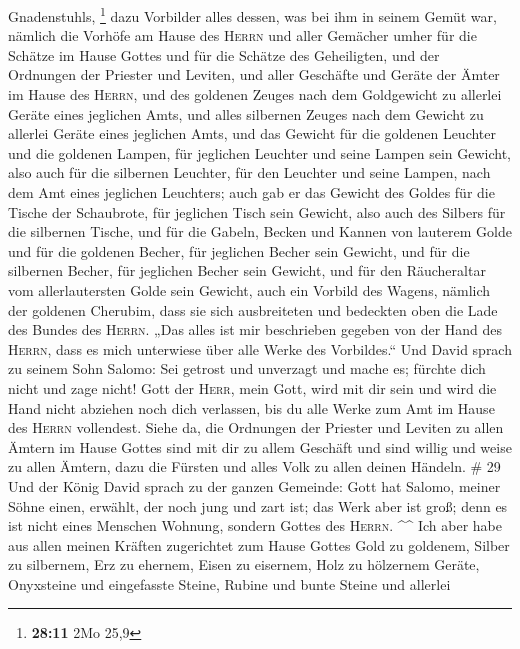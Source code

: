 Gnadenstuhls, \footnote{\textbf{28:11} 2Mo 25,9}  dazu
Vorbilder alles dessen, was bei ihm in seinem Gemüt war, nämlich die
Vorhöfe am Hause des \textsc{Herrn} und aller Gemächer umher für die
Schätze im Hause Gottes und für die Schätze des Geheiligten,
 und der Ordnungen der Priester und Leviten, und aller
Geschäfte und Geräte der Ämter im Hause des \textsc{Herrn},
 und des goldenen Zeuges nach dem Goldgewicht zu allerlei
Geräte eines jeglichen Amts, und alles silbernen Zeuges nach dem Gewicht
zu allerlei Geräte eines jeglichen Amts,  und das Gewicht
für die goldenen Leuchter und die goldenen Lampen, für jeglichen
Leuchter und seine Lampen sein Gewicht, also auch für die silbernen
Leuchter, für den Leuchter und seine Lampen, nach dem Amt eines
jeglichen Leuchters;  auch gab er das Gewicht des Goldes
für die Tische der Schaubrote, für jeglichen Tisch sein Gewicht, also
auch des Silbers für die silbernen Tische,  und für die
Gabeln, Becken und Kannen von lauterem Golde und für die goldenen
Becher, für jeglichen Becher sein Gewicht, und für die silbernen Becher,
für jeglichen Becher sein Gewicht,  und für den
Räucheraltar vom allerlautersten Golde sein Gewicht, auch ein Vorbild
des Wagens, nämlich der goldenen Cherubim, dass sie sich ausbreiteten
und bedeckten oben die Lade des Bundes des \textsc{Herrn}.
 „Das alles ist mir beschrieben gegeben von der Hand des
\textsc{Herrn}, dass es mich unterwiese über alle Werke des Vorbildes.``
 Und David sprach zu seinem Sohn Salomo: Sei getrost und
unverzagt und mache es; fürchte dich nicht und zage nicht! Gott der
\textsc{Herr}, mein Gott, wird mit dir sein und wird die Hand nicht
abziehen noch dich verlassen, bis du alle Werke zum Amt im Hause des
\textsc{Herrn} vollendest.  Siehe da, die Ordnungen der
Priester und Leviten zu allen Ämtern im Hause Gottes sind mit dir zu
allem Geschäft und sind willig und weise zu allen Ämtern, dazu die
Fürsten und alles Volk zu allen deinen Händeln. \# 29  Und
der König David sprach zu der ganzen Gemeinde: Gott hat Salomo, meiner
Söhne einen, erwählt, der noch jung und zart ist; das Werk aber ist
groß; denn es ist nicht eines Menschen Wohnung, sondern Gottes des
\textsc{Herrn}. \^{}\^{}  Ich aber habe aus allen meinen
Kräften zugerichtet zum Hause Gottes Gold zu goldenem, Silber zu
silbernem, Erz zu ehernem, Eisen zu eisernem, Holz zu hölzernem Geräte,
Onyxsteine und eingefasste Steine, Rubine und bunte Steine und allerlei
